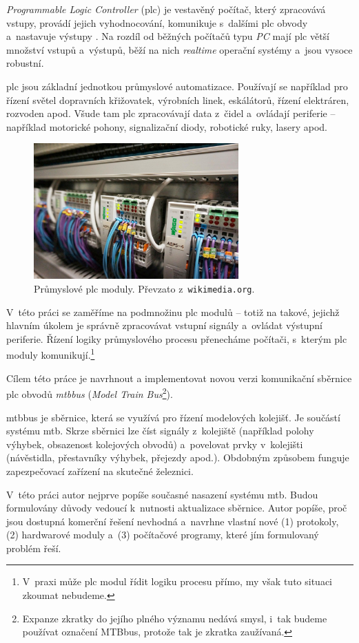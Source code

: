 \textit{Programmable Logic Controller} (\gls{plc}) je vestavěný počítač, který
zpracovává vstupy, provádí jejich vyhodnocování, komunikuje s~dalšími \gls{plc}
obvody a~nastavuje výstupy \cite{plc:web}. Na rozdíl od běžných počítačů typu
\textit{PC} mají \gls{plc} větší množství vstupů a~výstupů, běží na nich
\textit{realtime} operační systémy a~jsou vysoce robustní.

\gls{plc} jsou základní jednotkou průmyslové automatizace. Používají se
například pro řízení světel dopravních křižovatek, výrobních linek, eskálátorů,
řízení elektráren, rozvoden apod. Všude tam \gls{plc} zpracovávají data z~čidel
a~ovládají periferie – například motorické pohony, signalizační diody,
robotické ruky, lasery apod.

\begin{figure}[ht]
\includegraphics[width=0.7\textwidth]{data/plc.jpg}
\caption{Průmyslové \gls{plc} moduly. Převzato z~\texttt{wikimedia.org}.}
\label{fig:mtbusb-prototype}
\end{figure}

V~této práci se zaměříme na podmnožinu \gls{plc} modulů – totiž na takové,
jejichž hlavním úkolem je správně zpracovávat vstupní signály a~ovládat výstupní
periferie. Řízení logiky průmyslového procesu přenecháme počítači, s~kterým
\gls{plc} moduly komunikují.\footnote{V~praxi může \gls{plc} modul řídit logiku
procesu přímo, my však tuto situaci zkoumat nebudeme.}

Cílem této práce je navrhnout a implementovat novou verzi komunikační sběrnice
\gls{plc} obvodů \textit{\gls{mtbbus}} (\textit{Model Train
Bus}\footnote{Expanze zkratky do jejího plného významu nedává smysl, i~tak
budeme používat označení MTBbus, protože tak je zkratka zaužívaná.}).

\gls{mtbbus} je sběrnice, která se využívá pro řízení modelových kolejišť.
Je součástí systému \gls{mtb}. Skrze sběrnici lze číst signály z~kolejiště
(například polohy výhybek, obsazenost kolejových obvodů) a~povelovat prvky
v~kolejišti (návěstidla, přestavníky výhybek, přejezdy apod.). Obdobným
způsobem funguje zapezpečovací zařízení na skutečné železnici.

V~této práci autor nejprve popíše současné nasazení systému \gls{mtb}. Budou
formulovány důvody vedoucí k~nutnosti aktualizace sběrnice. Autor popíše, proč
jsou dostupná komerční řešení nevhodná a~navrhne vlastní nové (1) protokoly,
(2) hardwarové moduly a~(3) počítačové programy, které jím formulovaný problém
řeší.
